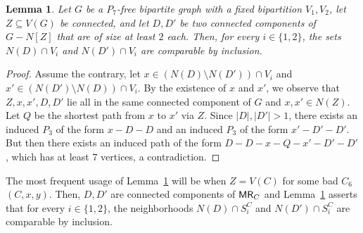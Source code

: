 \documentclass[11pt,a4paper]{article}
\newtheorem{lemma}[theorem]{Lemma}
\theoremstyle{definition}
\begin{document}
\begin{lemma}\label{lem:bip-MR-comparable}
Let $G$ be a $P_7$-free bipartite graph with a fixed bipartition $V_1,V_2$, let $Z \subseteq V(G)$ be connected,
and let $D,D'$ be two connected components of $G-N[Z]$ that are of size at least $2$ each.
Then, for every $i \in \{1,2\}$, the sets $N(D) \cap V_i$ and $N(D') \cap V_i$
are comparable by inclusion.
\end{lemma}
\begin{proof}
    Assume the contrary, let $x \in (N(D) \setminus N(D')) \cap V_i $
    and $x' \in (N(D') \setminus N(D)) \cap V_i$. 
    By the existence of $x$ and $x'$, we observe that $Z, x,x',D,D'$ lie all in the same connected component of $G$ and $x,x' \in N(Z)$. Let $Q$ be the shortest path from $x$ to $x'$ via $Z$. 
    Since $|D|,|D'| > 1$, there exists an induced $P_3$ of the form $x-D-D$ and an induced $P_3$ of the form $x'-D'-D'$.
    But then there exists an induced path of the form $D-D-x-Q-x'-D'-D'$, which has
    at least $7$ vertices, a contradiction.
\end{proof}

The most frequent usage of Lemma~\ref{lem:bip-MR-comparable} will be when $Z = V(C)$
for some bad $C_6$ $(C,x,y)$. Then, $D,D'$ are connected components of $\mathsf{MR}_C$
and Lemma~\ref{lem:bip-MR-comparable} asserts that for every $i \in \{1,2\}$, 
the neighborhoods $N(D) \cap S_i^C$ and $N(D') \cap S_i^C$ are comparable by inclusion.
\end{document}
